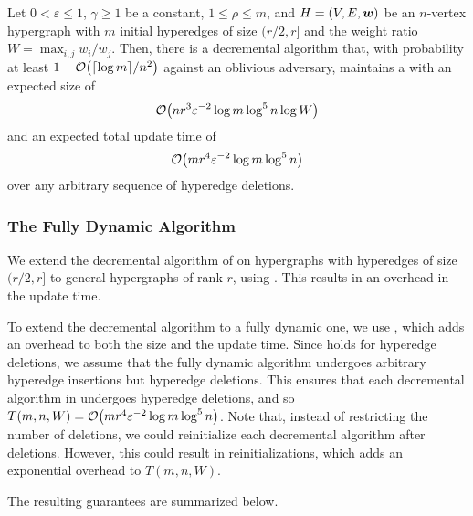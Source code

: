 \begin{corollary} \label{cor}
Let \( 0 < \varepsilon \leq 1 \), \( \gamma \geq 1 \) be a constant, \( 1 \leq \rho \leq m \), and  \( { H} = (V, E, \boldsymbol{w}) \) be an \( n \)-vertex hypergraph with \( m \) initial hyperedges of size \( (r/2, r] \) and the weight ratio \( W = \max _{i,j} w_i / w_j \).
Then, there is a decremental algorithm that, with probability at least \( 1 - \atmost{ \lceil \log m \rceil /n^2} \) against an oblivious adversary, maintains a \SpectralHypersparsifier{} with an expected size of 
\begin{equation*}
\atmost{ n r^3 \varepsilon ^{-2} \log m \log ^5 n \log W }
\end{equation*}
and an expected total update time of 
\begin{equation*}
\atmost{ m r^4 \varepsilon ^{-2} \log m \log ^5 n }
\end{equation*}
over any arbitrary sequence of  hyperedge deletions.
\end{corollary}




\subsubsection{The Fully Dynamic Algorithm} \label{subsec:fully_dynamic}


We extend the decremental algorithm of  on hypergraphs with hyperedges of size \( (r/2, r] \) to general hypergraphs of rank \( r \), using .
This results in an  overhead in the update time.

To extend the decremental algorithm to a fully dynamic one, we use , which adds an  overhead to both the size and the update time.
Since  holds for  hyperedge deletions, we assume that the fully dynamic algorithm undergoes arbitrary hyperedge insertions but  hyperedge deletions.
This ensures that each decremental algorithm in  undergoes  hyperedge deletions, and so \( T\left( m, n, W \right) = \atmost{ m r^4 \varepsilon ^{-2} \log m \log ^5 n } \).
Note that, instead of restricting the number of deletions, we could reinitialize each decremental algorithm after deletions.
However, this could result in  reinitializations, which adds an exponential overhead to \( T\left( m, n, W \right) \). 

The resulting guarantees are summarized below.

\main*







